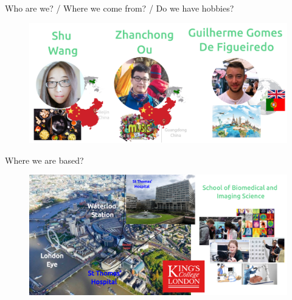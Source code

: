 
{
\begin{frame}{Who are we? / Where we come from? / Do we have hobbies?}

  \begin{figure}
  \centering
  \includegraphics[width=1.0\textwidth]{./../figures/team/who-we-are/versions/drawing-v09.png}
  \end{figure}

\end{frame}
}




{
\begin{frame}{Where we are based?}

  \begin{figure}
  \centering
  \includegraphics[width=1.0\textwidth]{./../figures/where-we-are-based/versions/drawing-v04.png}
  \end{figure}

\end{frame}
}



